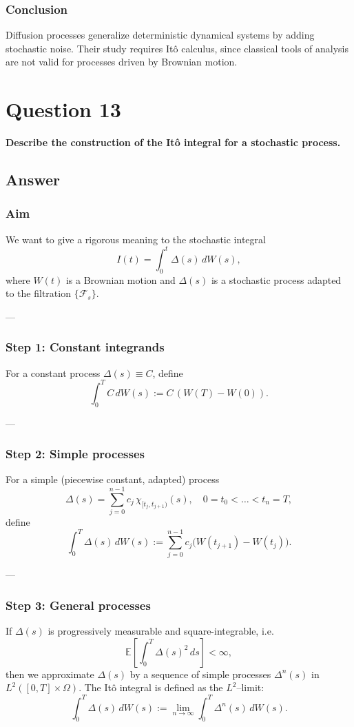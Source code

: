 \documentclass[12pt,a4paper]{book}
\theoremstyle{remark}
\newcommand{\EE}{\mathbb{E}}          %
\newcommand{\F}{\mathcal{F}}          %
\begin{document}
\subsubsection*{Conclusion}
Diffusion processes generalize deterministic dynamical systems by adding stochastic noise. Their study requires Itô calculus, since classical tools of analysis are not valid for processes driven by Brownian motion.


\newpage
\section{Question 13}
\textbf{Describe the construction of the Itô integral for a stochastic process.}

\subsection*{Answer}

\subsubsection*{Aim}
We want to give a rigorous meaning to the stochastic integral
\[
I(t) = \int_0^t \Delta(s)\,dW(s),
\]
where $W(t)$ is a Brownian motion and $\Delta(s)$ is a stochastic process adapted to the filtration $\{\F_s\}$.

---

\subsubsection*{Step 1: Constant integrands}
For a constant process $\Delta(s) \equiv C$, define
\[
\int_0^T C\,dW(s) := C\,(W(T)-W(0)).
\]

---

\subsubsection*{Step 2: Simple processes}
For a simple (piecewise constant, adapted) process
\[
\Delta(s) = \sum_{j=0}^{n-1} c_j \,\chi_{[t_j,t_{j+1})}(s), \quad 0=t_0<\dots<t_n=T,
\]
define
\[
\int_0^T \Delta(s)\,dW(s) := \sum_{j=0}^{n-1} c_j \big(W(t_{j+1})-W(t_j)\big).
\]

---

\subsubsection*{Step 3: General processes}
If $\Delta(s)$ is progressively measurable and square-integrable, i.e.
\[
\EE\!\left[\int_0^T \Delta(s)^2 \,ds\right] < \infty,
\]
then we approximate $\Delta(s)$ by a sequence of simple processes $\Delta^n(s)$ in $L^2([0,T]\times\Omega)$.  
The Itô integral is defined as the $L^2$–limit:
\[
\int_0^T \Delta(s)\,dW(s) := \lim_{n\to\infty} \int_0^T \Delta^n(s)\,dW(s).
\]
\end{document}
